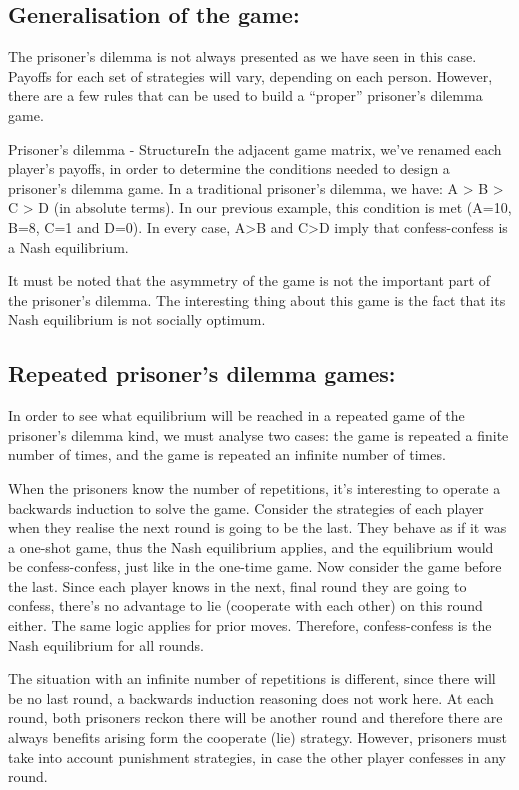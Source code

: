 \documentclass[]{report}
\begin{document}
\subsection{Generalisation of the game:}

The prisoner’s dilemma is not always presented as we have seen in this case. Payoffs for each set of strategies will vary, depending on each person. However, there are a few rules that can be used to build a “proper” prisoner’s dilemma game.

Prisoner's dilemma - StructureIn the adjacent game matrix, we’ve renamed each player’s payoffs, in order to determine the conditions needed to design a prisoner’s dilemma game. In a traditional prisoner’s dilemma, we have: A > B > C > D (in absolute terms). In our previous example, this condition is met (A=10, B=8, C=1 and D=0). In every case, A>B and C>D imply that confess-confess is a Nash equilibrium.

It must be noted that the asymmetry of the game is not the important part of the prisoner’s dilemma. The interesting thing about this game is the fact that its Nash equilibrium is not socially optimum.



\subsection{Repeated prisoner’s dilemma games:}

In order to see what equilibrium will be reached in a repeated game of the prisoner’s dilemma kind, we must analyse two cases: the game is repeated a finite number of times, and the game is repeated an infinite number of times.

When the prisoners know the number of repetitions, it’s interesting to operate a backwards induction to solve the game. Consider the strategies of each player when they realise the next round is going to be the last. They behave as if it was a one-shot game, thus the Nash equilibrium applies, and the equilibrium would be confess-confess, just like in the one-time game. Now consider the game before the last. Since each player knows in the next, final round they are going to confess, there’s no advantage to lie (cooperate with each other) on this round either. The same logic applies for prior moves. Therefore, confess-confess is the Nash equilibrium for all rounds.

The situation with an infinite number of repetitions is different, since there will be no last round, a backwards induction reasoning does not work here. At each round, both prisoners reckon there will be another round and therefore there are always benefits arising form the cooperate (lie) strategy. However, prisoners must take into account punishment strategies, in case the other player confesses in any round.
\end{document}
